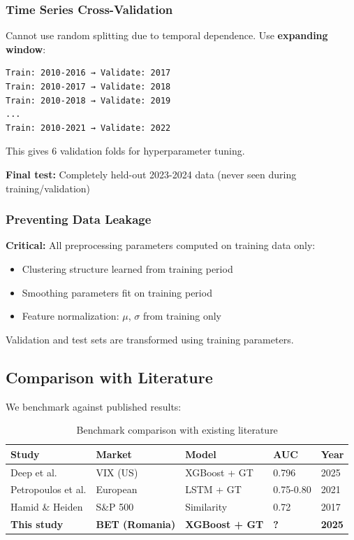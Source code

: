 \documentclass[12pt,a4paper]{article}
\begin{document}
\subsubsection{Time Series Cross-Validation}

Cannot use random splitting due to temporal dependence. Use \textbf{expanding window}:

\begin{verbatim}
Train: 2010-2016 → Validate: 2017
Train: 2010-2017 → Validate: 2018
Train: 2010-2018 → Validate: 2019
...
Train: 2010-2021 → Validate: 2022
\end{verbatim}

This gives 6 validation folds for hyperparameter tuning.

\textbf{Final test:} Completely held-out 2023-2024 data (never seen during training/validation)

\subsubsection{Preventing Data Leakage}

\textbf{Critical:} All preprocessing parameters computed on training data only:
\begin{itemize}
    \item Clustering structure learned from training period
    \item Smoothing parameters fit on training period
    \item Feature normalization: $\mu$, $\sigma$ from training only
\end{itemize}

Validation and test sets are transformed using training parameters.

\subsection{Comparison with Literature}

We benchmark against published results:

\begin{table}[h]
\centering
\begin{tabular}{lllll}
\hline
\textbf{Study} & \textbf{Market} & \textbf{Model} & \textbf{AUC} & \textbf{Year} \\
\hline
Deep et al. & VIX (US) & XGBoost + GT & 0.796 & 2025 \\
Petropoulos et al. & European & LSTM + GT & 0.75-0.80 & 2021 \\
Hamid \& Heiden & S\&P 500 & Similarity & 0.72 & 2017 \\
\hline
\textbf{This study} & \textbf{BET (Romania)} & \textbf{XGBoost + GT} & \textbf{?} & \textbf{2025} \\
\hline
\end{tabular}
\caption{Benchmark comparison with existing literature}
\end{table}
\end{document}
